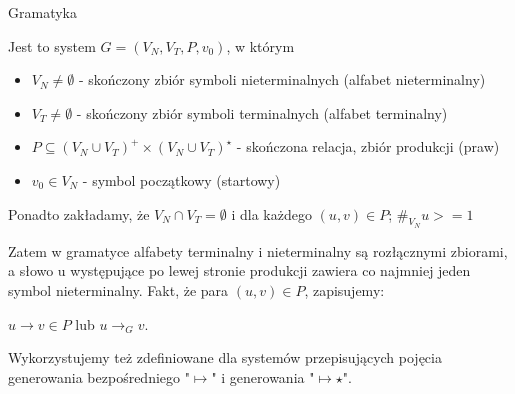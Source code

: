 \documentclass[12pt]{article}
\begin{document}
    \begin{definition}
        Gramatyka

        Jest to system $G=(V_N,V_T,P,v_0)$, w którym
        \begin{itemize}
            \item
            $V_N \ne \emptyset$ - skończony zbiór symboli nieterminalnych (alfabet nieterminalny)
            \item
            $V_T \ne \emptyset$ - skończony zbiór symboli terminalnych (alfabet terminalny)
            \item
            $P \subseteq (V_N \cup V_T)^+ \times (V_N \cup V_T)^\star$ - skończona relacja, zbiór produkcji (praw)
            \item
            $v_0 \in V_N$ - symbol początkowy (startowy)
        \end{itemize}

        Ponadto zakładamy, że $V_N \cap V_T = \emptyset$ i dla każdego
        $(u,v)\in P$; $\#_{V_N} u >= 1$

        Zatem w gramatyce alfabety terminalny i nieterminalny są rozłącznymi zbiorami, a słowo u występujące po lewej stronie produkcji zawiera co najmniej jeden symbol nieterminalny. Fakt, że para $(u,v) \in P$, zapisujemy:

        $u \rightarrow v \in P$ lub $u \rightarrow_G v$.

        Wykorzystujemy też zdefiniowane dla systemów przepisujących pojęcia generowania bezpośredniego "$\mapsto$" i generowania "$\mapsto \star$".
    \end{definition}
\end{document}
